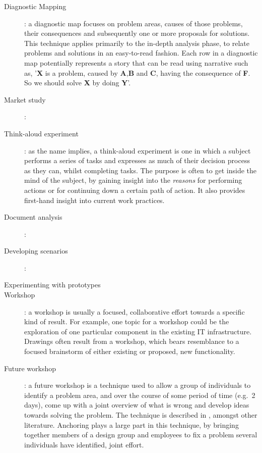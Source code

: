 \begin{description}
    \item [Diagnostic Mapping]: a diagnostic map focuses on problem areas, causes of those problems, their consequences
        and subsequently one or more proposals for solutions. This technique applies primarily to the in-depth analysis phase,
        to relate problems and solutions in an easy-to-read fashion. Each row in a diagnostic map potentially represents a story 
        that can be read using narrative such as, '\textbf{X} is a problem, caused by \textbf{A},\textbf{B} and \textbf{C}, having 
        the consequence of \textbf{F}. So we should solve \textbf{X} by doing \textbf{Y}'. 
    \item [Market study]:
    \item [Think-aloud experiment]: as the name implies, a think-aloud experiment is one in which a subject performs
        a series of tasks and expresses as much of their decision process as they can, whilst completing tasks. The
        purpose is often to get inside the mind of the subject, by gaining insight into the \textit{reasons} for performing
        actions or for continuing down a certain path of action. It also provides first-hand insight into current work practices.
    \item [Document analysis]:
    \item [Developing scenarios]:
    \item [Experimenting with prototypes]
    \item [Workshop]: a workshop is usually a focused, collaborative effort towards a specific kind of result. For example,
        one topic for a workshop could be the exploration of one particular component in the existing IT infrastructure. Drawings
        often result from a workshop, which bears resemblance to a focused brainstorm of either existing or proposed, new functionality.

    \item [Future workshop]: a future workshop is a technique used to allow a group of individuals to identify a problem area, and over
        the course of some period of time (e.g.\ 2 days), come up with a joint overview of what is wrong and develop ideas towards solving
        the problem. The technique is described in \cite{kensing1991generating}, amongst other literature. Anchoring plays a large part in
        this technique, by bringing together members of a design group and employees to fix a problem several individuals have identified,
        joint effort.
 
\end{description}

